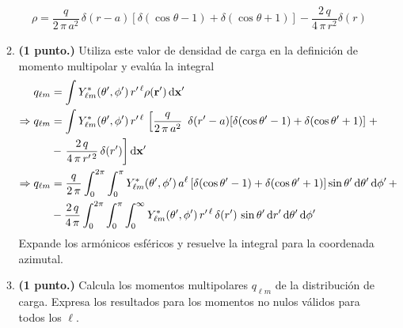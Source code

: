 \begin{enumerate}
\begin{enumerate}
\begin{align*}
\rho = \dfrac{q}{2 \, \pi \, a^{2}} \, \delta(r -a) [\delta (\cos \theta - 1) + \delta (\cos \theta + 1)] - \dfrac{2 \, q}{4 \, \pi \, r^{2}} \delta(r)
\end{align*}
\item \textbf{(1 punto.) } Utiliza este valor de densidad de carga en la definición de momento multipolar y evalúa la integral
\begin{align*}
q_{\ell m} &= \int Y_{\ell  m}^{*} (\theta^{\prime}, \phi^{\prime}) \, r^{\prime \, \ell} \rho (\vb{r}^{\prime}) \dd{\vb{x}^{\prime}} \\
\Rightarrow q_{\ell m} &= \int Y_{\ell  m}^{*} (\theta^{\prime}, \phi^{\prime}) \, r^{\prime \, \ell} \, \left[\dfrac{q}{2 \, \pi \, a^{2}} \ \, \delta(r^{\prime} - a) [\delta (\cos \theta^{\prime} - 1) + \delta (\cos \theta^{\prime} + 1)]  \right. + \\
&- \left. \dfrac{2 \, q}{4 \, \pi \, r^{\prime \, 2}} \, \delta(r^{\prime}) \right] \dd{\vb{x}^{\prime}} \\
\Rightarrow q_{\ell m} &= \dfrac{q}{2 \, \pi} \int_{0}^{2 \pi} \int_{0}^{\pi} Y_{\ell  m}^{*} (\theta^{\prime}, \phi^{\prime}) \, a^{\ell} \, [\delta (\cos \theta^{\prime} - 1) + \delta (\cos \theta^{\prime} + 1)] \sin \theta^{\prime} \dd{\theta^{\prime}} \dd{\phi^{\prime}} + \\
&- \dfrac{2 \, q}{4 \, \pi} \int_{0}^{2 \pi} \int_{0}^{\pi} \int_{0}^{\infty} Y_{\ell  m}^{*} (\theta^{\prime}, \phi^{\prime}) \, r^{\prime \, \ell} \, \delta(r^{\prime}) \, \sin \theta^{\prime} \dd{r^{\prime}} \dd{\theta^{\prime}} \dd{\phi^{\prime}}
\end{align*}
Expande los armónicos esféricos y resuelve la integral para la coordenada azimutal.
\item \textbf{(1 punto.) } Calcula los momentos multipolares $q_{\ell m}$ de la distribución de carga. Expresa los resultados para los momentos no nulos válidos para todos los $\ell$.
\par
\end{enumerate}
\end{enumerate}
